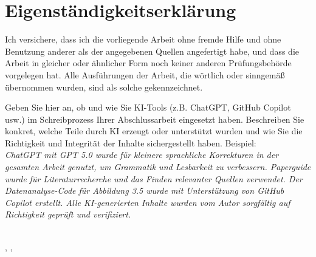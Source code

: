 \chapter*{Eigenständigkeitserklärung}

Ich versichere, dass ich die vorliegende Arbeit ohne fremde Hilfe und ohne Benutzung anderer als der angegebenen Quellen angefertigt habe, und dass die Arbeit in gleicher oder ähnlicher Form noch keiner anderen Prüfungsbehörde vorgelegen hat. Alle Ausführungen der Arbeit, die wörtlich oder sinngemäß übernommen wurden, sind als solche gekennzeichnet.

{
    \color{orange}
    Geben Sie hier an, ob und wie Sie KI-Tools (z.B. ChatGPT, GitHub Copilot usw.) im Schreibprozess Ihrer Abschlussarbeit eingesetzt haben.
    Beschreiben Sie konkret, welche Teile durch KI erzeugt oder unterstützt wurden und wie Sie die Richtigkeit und Integrität der Inhalte sichergestellt haben. Beispiel:\\
    \emph{ChatGPT mit GPT 5.0 wurde für kleinere sprachliche Korrekturen in der gesamten Arbeit genutzt, um Grammatik und Lesbarkeit zu verbessern.
    Paperguide wurde für Literaturrecherche und das Finden relevanter Quellen verwendet.
    Der Datenanalyse-Code für Abbildung 3.5 wurde mit Unterstützung von GitHub Copilot erstellt.
    Alle KI-generierten Inhalte wurden vom Autor sorgfältig auf Richtigkeit geprüft und verifiziert.}
}

\vspace{2cm}
\makebox[10cm]{\hrulefill}\\
\noindent \Author, \City, \SubmissionMonth
